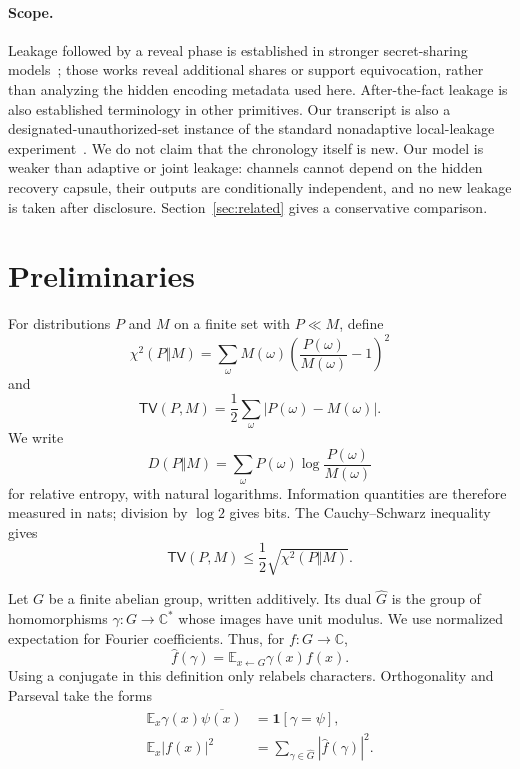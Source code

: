 \documentclass[11pt]{article}
\theoremstyle{definition}
\newcommand{\E}{\mathbb{E}}
\newcommand{\TV}{\mathsf{TV}}
\newcommand{\chitwo}{\chi^2}
\begin{document}
\paragraph{Scope.}
Leakage followed by a reveal phase is established in stronger secret-sharing
models~\cite{ckos21,hvw25}; those works reveal additional shares or support
equivocation, rather than analyzing the hidden encoding metadata used here.
After-the-fact leakage is also established terminology in other primitives.
Our transcript is also a designated-unauthorized-set instance of the standard
nonadaptive local-leakage experiment~\cite{sv19}.  We do not claim that the
chronology itself is new.  Our model is weaker than
adaptive or joint leakage: channels cannot depend on the hidden recovery capsule,
their outputs are conditionally independent, and no new leakage is taken after
disclosure.  Section~\ref{sec:related} gives a conservative comparison.

\section{Preliminaries}

For distributions $P$ and $M$ on a finite set with $P\ll M$, define
\[
  \chitwo(P\Vert M)
    = \sum_{\omega}M(\omega)
      \left(\frac{P(\omega)}{M(\omega)}-1\right)^2
\]
and
\[
  \TV(P,M)=\frac12\sum_{\omega}|P(\omega)-M(\omega)|.
\]
We write
\[
  D(P\Vert M)=\sum_\omega P(\omega)
       \log\frac{P(\omega)}{M(\omega)}
\]
for relative entropy, with natural logarithms.  Information quantities are
therefore measured in nats; division by $\log 2$ gives bits.
The Cauchy--Schwarz inequality gives
\begin{equation}\label{eq:tvchi}
  \TV(P,M)\leq \frac12\sqrt{\chitwo(P\Vert M)}.
\end{equation}

Let $G$ be a finite abelian group, written additively.  Its dual $\widehat G$
is the group of homomorphisms $\gamma:G\to\mathbb{C}^{*}$ whose images have
unit modulus.  We use normalized expectation for Fourier coefficients.  Thus,
for $f:G\to\mathbb{C}$,
\[
    \widehat f(\gamma)=\E_{x\leftarrow G}\gamma(x)f(x).
\]
Using a conjugate in this definition only relabels characters.  Orthogonality and
Parseval take the forms
\begin{align}
 \E_x\gamma(x)\overline{\psi(x)}&=\mathbf 1[\gamma=\psi],\label{eq:orth}\\
 \E_x|f(x)|^2&=\sum_{\gamma\in\widehat G}|\widehat f(\gamma)|^2.
 \label{eq:parseval}
\end{align}
\end{document}
